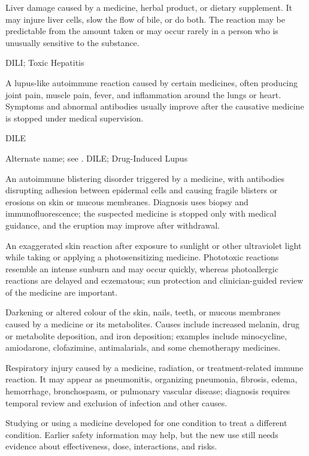  Liver damage caused by a medicine, herbal product,
or dietary supplement. It may injure liver cells, slow the flow of bile, or do both.
The reaction may be predictable from the amount taken or may occur rarely in a person
who is unusually sensitive to the substance.

\synonyms
DILI; Toxic Hepatitis

 A lupus-like autoimmune reaction caused by certain medicines, often producing joint pain, muscle pain, fever, and inflammation around the lungs or heart. Symptoms and abnormal antibodies usually improve after the causative medicine is stopped under medical supervision.

\synonyms
DILE

 Alternate name; see .
\synonyms
DILE; Drug-Induced Lupus


 An autoimmune blistering disorder triggered by a medicine, with antibodies disrupting adhesion between epidermal cells and causing fragile blisters or erosions on skin or mucous membranes. Diagnosis uses biopsy and immunofluorescence; the suspected medicine is stopped only with medical guidance, and the eruption may improve after withdrawal.

 An exaggerated skin reaction after exposure to sunlight or other ultraviolet light while taking or applying a photosensitizing medicine. Phototoxic reactions resemble an intense sunburn and may occur quickly, whereas photoallergic reactions are delayed and eczematous; sun protection and clinician-guided review of the medicine are important.

 Darkening or altered colour of the skin, nails, teeth, or mucous membranes caused by a medicine or its metabolites. Causes include increased melanin, drug or metabolite deposition, and iron deposition; examples include minocycline, amiodarone, clofazimine, antimalarials, and some chemotherapy medicines.

 Respiratory injury caused by a medicine, radiation, or treatment-related immune reaction. It may appear as pneumonitis, organizing pneumonia, fibrosis, edema, hemorrhage, bronchospasm, or pulmonary vascular disease; diagnosis requires temporal review and exclusion of infection and other causes.

 Studying or using a medicine developed for one condition to treat a different condition. Earlier safety information may help, but the new use still needs evidence about effectiveness, dose, interactions, and risks.

